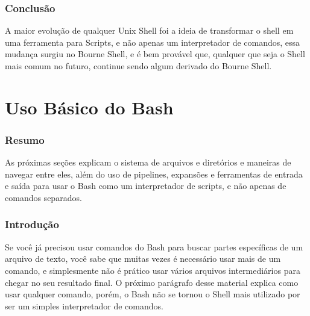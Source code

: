 \documentclass[oneside, 11 pt]{article}
\begin{document}
	\section{Conclusão}
	A maior evolução de qualquer Unix Shell foi a ideia de transformar o shell em uma ferramenta para Scripts, e não apenas um interpretador de comandos, essa mudança surgiu no Bourne Shell, e é bem provável que, qualquer que seja o Shell mais comum no futuro, continue sendo algum derivado do Bourne Shell.
	
	\newpage
	\part{Uso Básico do Bash}
	\section{Resumo}
	 As próximas seções explicam o sistema de arquivos e diretórios e maneiras de navegar entre eles, além do uso de pipelines, expansões e ferramentas de entrada e saída para usar o Bash como um interpretador de scripts, e não apenas de comandos separados.
	
	\section{Introdução}
	Se você já precisou usar comandos do Bash para buscar partes específicas de um arquivo de texto, você sabe que muitas vezes é necessário usar mais de um comando, e simplesmente não é prático usar vários arquivos intermediários para chegar no seu resultado final. O próximo parágrafo desse material explica como usar qualquer comando, porém, o Bash não se tornou o Shell mais utilizado por ser um simples interpretador de comandos.
	
\end{document}
